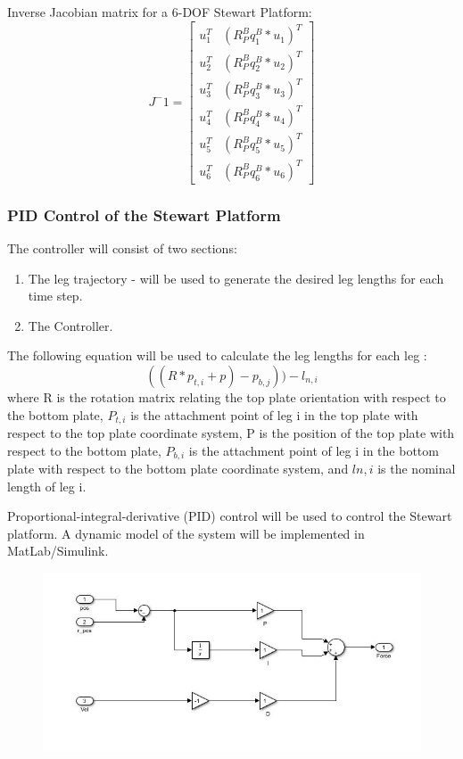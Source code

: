 Inverse Jacobian matrix for a 6-DOF Stewart Platform:
\[ J^-1 =
\begin{bmatrix}
u_{1}^{T} & (R_{P}^{B}q_{1}^{B} * u_{1})^T\\
u_{2}^{T} & (R_{P}^{B}q_{2}^{B} * u_{2})^T\\
u_{3}^{T} & (R_{P}^{B}q_{3}^{B} * u_{3})^T\\
u_{4}^{T} & (R_{P}^{B}q_{4}^{B} * u_{4})^T\\
u_{5}^{T} & (R_{P}^{B}q_{5}^{B} * u_{5})^T\\
u_{6}^{T} & (R_{P}^{B}q_{6}^{B} * u_{6})^T
\end{bmatrix}
\]
\subsubsection{PID Control of the Stewart Platform}
The controller will consist of two sections:
\begin{enumerate}
\item The leg trajectory - will be used to generate the desired leg lengths for each time step.
\item The Controller.
\end{enumerate}  The following equation will be used to calculate the leg lengths for each leg 
\cite{smith2002creating}:
\begin{equation}
\label{eqn}
((R*p_{t,i} + p)-p_{b,j}))- l_{n,i}
\end{equation}
where R is the rotation matrix relating the top plate orientation with respect to the bottom plate, $P_{t,i}$ is the attachment point of leg i in the top plate with respect to the top plate coordinate system, P is the position of the top plate with respect to the bottom plate, $P_{b,i}$ is the attachment point of leg i in the bottom plate with respect to the bottom plate coordinate system, and $ln,i$ is the nominal length of leg i. 

Proportional-integral-derivative (PID) control will be used to control the Stewart platform. A dynamic model of the system will be implemented in MatLab/Simulink.
\begin{center}
	\begin{figure}
	\centering
	\includegraphics{Figures/Fig13}
	\end{figure}
\end{center}
